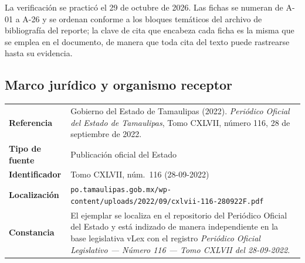 \documentclass[12pt,letterpaper]{article}
\begin{document}
La verificación se practicó el 29 de octubre de 2026. Las fichas se numeran de A-01 a A-26 y se ordenan conforme a los
bloques temáticos del archivo de bibliografía del reporte; la clave de cita que encabeza cada ficha es la misma que se
emplea en el documento, de manera que toda cita del texto puede rastrearse hasta su evidencia.

\vspace{4pt}


\subsection*{Marco jurídico y organismo receptor}

\begin{table}[H]
  \small
  \renewcommand{\arraystretch}{1.25}
  \begin{tabularx}{\textwidth}{@{}>{\raggedright\arraybackslash}p{3.0cm}>{\raggedright\arraybackslash}X@{}}
    \toprule
    \multicolumn{2}{@{}l}{\textbf{Ficha A-01} \quad\textnormal{\footnotesize clave de cita: \texttt{poe2022irct}}} \\
    \midrule
    \textbf{Referencia} & Gobierno del Estado de Tamaulipas (2022). \emph{Periódico Oficial del Estado de Tamaulipas}, Tomo CXLVII, número 116, 28 de septiembre de 2022. \\
    \textbf{Tipo de fuente} & Publicación oficial del Estado \\
    \textbf{Identificador} & Tomo CXLVII, núm.\ 116 (28-09-2022) \\
    \textbf{Localización} & \texttt{\footnotesize po.tamaulipas.gob.mx/wp-content/uploads/2022/09/\allowbreak cxlvii-116-280922F.pdf} \\
    \textbf{Constancia} & El ejemplar se localiza en el repositorio del Periódico Oficial del Estado y está indizado de manera independiente en la base legislativa vLex con el registro \emph{Periódico Oficial Legislativo --- Número 116 --- Tomo CXLVII del 28-09-2022}. \\
    \bottomrule
  \end{tabularx}
\end{table}
\end{document}
